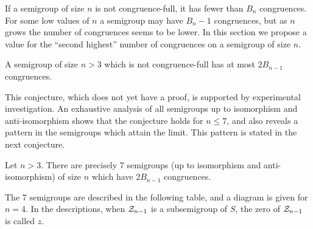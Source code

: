 If a semigroup of size $n$ is not congruence-full, it has fewer than $B_n$
congruences.  For some low values of $n$ a semigroup may have $B_n - 1$
congruences, but as $n$ grows the number of congruences seems to be lower.  In
this section we propose a value for the ``second highest'' number of congruences
on a semigroup of size $n$.

\begin{conjecture}
  A semigroup of size $n > 3$ which is not congruence-full has at most
  $2B_{n-1}$ congruences.
\end{conjecture}

This conjecture, which does not yet have a proof, is supported by experimental
investigation.  An exhaustive analysis of all semigroups up to isomorphism and
anti-isomorphism shows that the conjecture holds for $n \leq 7$, and also
reveals a pattern in the semigroups which attain the limit.  This pattern is
stated in the next conjecture.

\begin{conjecture}
  Let $n > 3$.  There are precisely 7 semigroups (up to isomorphism and
  anti-isomorphism) of size $n$ which have $2B_{n-1}$ congruences.
\end{conjecture}

The 7 semigroups are described in the following table, and a diagram is given
for $n = 4$.  In the descriptions, when $\mathcal{Z}_{n-1}$ is a subsemigroup of $S$, the
zero of $\mathcal{Z}_{n-1}$ is called $z$.

